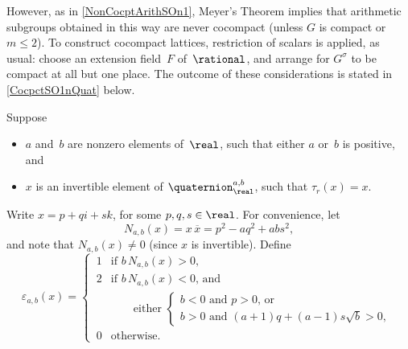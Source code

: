 However, as in \cref{NonCocptArithSOn1}, Meyer's Theorem implies that arithmetic subgroups obtained in this way are never cocompact (unless $G$ is compact or $m \le 2$). To construct cocompact lattices, restriction of scalars is applied, as usual: choose an extension field~$F$ of~$\rational$, and arrange for $G^\sigma$ to be compact at all but one place. The outcome of these considerations is stated in \cref{CocpctSO1nQuat} below. %

\begin{notation} \label{QuatEigs}
 Suppose
 \noprelistbreak
 \begin{itemize}
 \item $a$ and~$b$ are nonzero elements
of~$\real$, such that either $a$ or~$b$ is
positive, and
 \item $x$ is an invertible element of
$\quaternion^{a,b}_\real$, such that $\tau_r(x) = x$.
 \end{itemize}
 Write $x = p + qi + sk$, for some $p,q,s \in \real$.
 For convenience, let 
 	$$N_{a,b}(x) = x \, \overline{x} = p^2 - a q^2 + a b s^2 , $$
and note that $N_{a,b}(x) \neq 0$ (since $x$ is invertible). Define
 $$
 \varepsilon_{a,b}(x) =
 \begin{cases}
 \,1 & \mbox{if $b \, N_{a,b}(x) > 0$} , \\
 \,2 & \mbox{if $b \, N_{a,b}(x) < 0$, and} \\[-2pt] %
 	& \qquad \text{either } \begin{cases}
	\text{$b < 0$ and $p > 0$, or} \\
	\text{$b > 0$ and $(a+1)q + (a - 1) s \sqrt{b} > 0$},
	\end{cases} \\[-4pt] %
 \,0 & \mbox{otherwise} .
 \end{cases}
 $$
 \end{notation}

